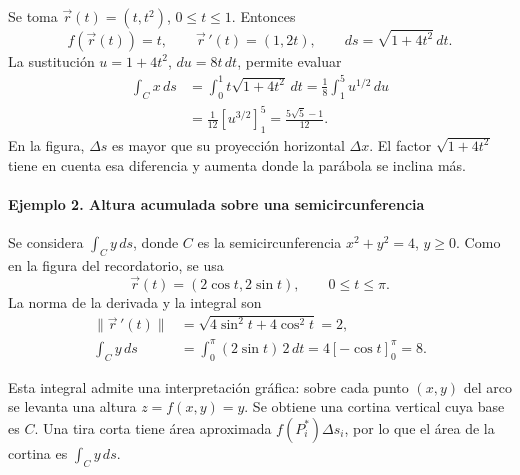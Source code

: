 Se toma $\vec r(t)=(t,t^2)$, $0\leq t\leq1$. Entonces
\[
f(\vec r(t))=t,\qquad
\vec r\,'(t)=(1,2t),\qquad ds=\sqrt{1+4t^2}\,dt.
\]
La sustitución $u=1+4t^2$, $du=8t\,dt$, permite evaluar
\begin{align*}
\int_C x\,ds
&=\int_0^1 t\sqrt{1+4t^2}\,dt
=\frac18\int_1^5 u^{1/2}\,du\\
&=\frac1{12}\left[u^{3/2}\right]_1^5
=\frac{5\sqrt5-1}{12}.
\end{align*}
En la figura, $\Delta s$ es mayor que su proyección horizontal $\Delta x$. El factor $\sqrt{1+4t^2}$ tiene en cuenta esa diferencia y aumenta donde la parábola se inclina más.

\paragraph{Ejemplo 2. Altura acumulada sobre una semicircunferencia}

Se considera $\int_C y\,ds$, donde $C$ es la semicircunferencia $x^2+y^2=4$, $y\geq0$. Como en la figura del recordatorio, se usa
\[
\vec r(t)=(2\cos t,2\sin t),\qquad 0\leq t\leq\pi.
\]
La norma de la derivada y la integral son
\begin{align*}
\|\vec r\,'(t)\|
&=\sqrt{4\sin^2t+4\cos^2t}=2,\\
\int_C y\,ds
&=\int_0^\pi (2\sin t)\,2\,dt
=4[-\cos t]_0^\pi=8.
\end{align*}

Esta integral admite una interpretación gráfica: sobre cada punto $(x,y)$ del arco se levanta una altura $z=f(x,y)=y$. Se obtiene una cortina vertical cuya base es $C$. Una tira corta tiene área aproximada $f(P_i^*)\Delta s_i$, por lo que el área de la cortina es $\int_C y\,ds$.

